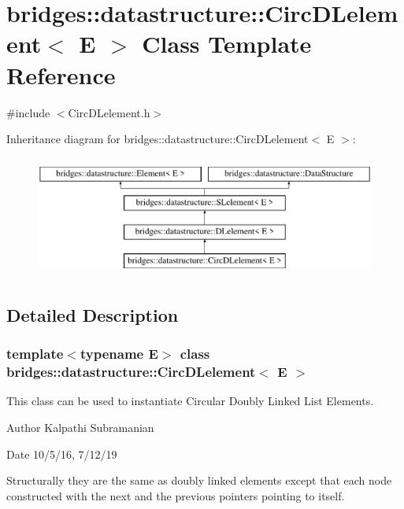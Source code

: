 \hypertarget{classbridges_1_1datastructure_1_1_circ_d_lelement}{}\section{bridges\+:\+:datastructure\+:\+:Circ\+D\+Lelement$<$ E $>$ Class Template Reference}
\label{classbridges_1_1datastructure_1_1_circ_d_lelement}


{\ttfamily \#include $<$Circ\+D\+Lelement.\+h$>$}

Inheritance diagram for bridges\+:\+:datastructure\+:\+:Circ\+D\+Lelement$<$ E $>$\+:\begin{figure}[H]
\begin{center}
\leavevmode
\includegraphics[height=4.000000cm]{classbridges_1_1datastructure_1_1_circ_d_lelement}
\end{center}
\end{figure}


\subsection{Detailed Description}
\subsubsection*{template$<$typename E$>$\newline
class bridges\+::datastructure\+::\+Circ\+D\+Lelement$<$ E $>$}

This class can be used to instantiate Circular Doubly Linked List Elements. 

\begin{DoxyAuthor}{Author}
Kalpathi Subramanian 
\end{DoxyAuthor}
\begin{DoxyDate}{Date}
10/5/16, 7/12/19
\end{DoxyDate}
Structurally they are the same as doubly linked elements except that each node constructed with the next and the previous pointers pointing to itself.

